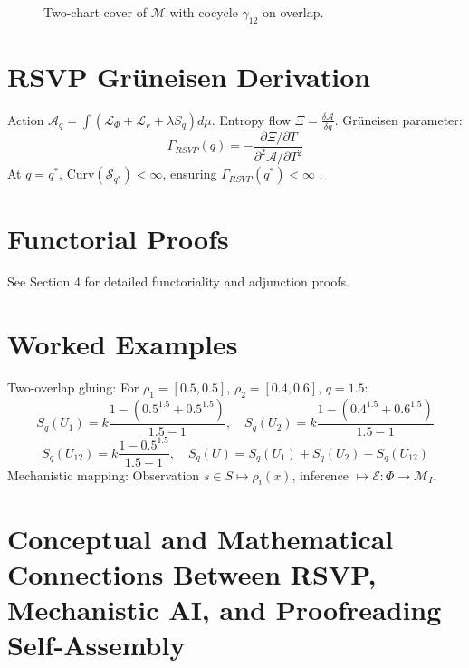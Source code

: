 \documentclass{article}
\begin{document}
\begin{figure}[h]
\centering
{}
\caption{Two-chart cover of $\mathcal{M}$ with cocycle $\gamma_{12}$ on overlap.}
\label{fig:sheaf_cover}
\end{figure}

\section{RSVP Grüneisen Derivation}

Action $\mathcal{A}_q = \int (\mathcal{L}_\Phi + \mathcal{L}_\mathcal{v} + \lambda S_q) d\mu$. Entropy flow $\Xi = \frac{\delta \mathcal{A}}{\delta g}$. Grüneisen parameter:
\[
\Gamma_{RSVP}(q) = - \frac{\partial \Xi / \partial T}{\partial^2 \mathcal{A} / \partial T^2}
\]
At $q = q^*$, $\text{Curv}(\mathcal{S}_{q^*}) < \infty$, ensuring $\Gamma_{RSVP}(q^*) < \infty$ \cite{Soares2024}.

\section{Functorial Proofs}

See Section 4 for detailed functoriality and adjunction proofs.

\section{Worked Examples}

Two-overlap gluing: For $\rho_1 = [0.5, 0.5]$, $\rho_2 = [0.4, 0.6]$, $q=1.5$:
\[
S_q(U_1) = k \frac{1 - (0.5^{1.5} + 0.5^{1.5})}{1.5-1}, \quad S_q(U_2) = k \frac{1 - (0.4^{1.5} + 0.6^{1.5})}{1.5-1}
\]
\[
S_q(U_{12}) = k \frac{1 - 0.5^{1.5}}{1.5-1}, \quad S_q(U) = S_q(U_1) + S_q(U_2) - S_q(U_{12})
\]
Mechanistic mapping: Observation $s \in S \mapsto \rho_i(x)$, inference $\mapsto \mathcal{E}: \Phi \to \mathcal{M}_I$.

\section{Conceptual and Mathematical Connections Between RSVP, Mechanistic AI, and Proofreading Self-Assembly}
\end{document}
